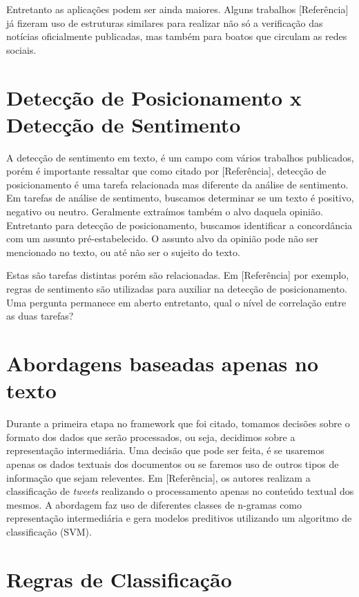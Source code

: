 \quad Entretanto as aplicações podem ser ainda maiores. Alguns trabalhos [Referência]
já fizeram uso de estruturas similares para realizar não só a verificação das notícias
oficialmente publicadas, mas também para boatos que circulam as redes sociais.

\section{Detecção de Posicionamento x Detecção de Sentimento}

\quad A detecção de sentimento em texto, é um campo com vários trabalhos publicados,
porém é importante ressaltar que como citado por [Referência], detecção de
posicionamento é uma tarefa relacionada mas diferente da análise de sentimento.
Em tarefas de análise de sentimento, buscamos determinar se um texto é positivo,
negativo ou neutro. Geralmente extraímos também o alvo daquela opinião. Entretanto
para detecção de posicionamento, buscamos identificar a concordância com um assunto
pré-estabelecido. O assunto alvo da opinião pode não ser mencionado no texto, ou até
não ser o sujeito do texto.

\quad Estas são tarefas distintas porém são relacionadas. Em [Referência] por exemplo,
regras de sentimento são utilizadas para auxiliar na detecção de posicionamento. Uma
pergunta permanece em aberto entretanto, qual o nível de correlação entre as
duas tarefas?

\section{Abordagens baseadas apenas no texto}

\quad Durante a primeira etapa no framework que foi citado, tomamos decisões sobre o
formato dos dados que serão processados, ou seja, decidimos sobre a representação
intermediária. Uma decisão que pode ser feita, é se usaremos apenas os dados
textuais dos documentos ou se faremos uso de outros tipos de informação que sejam
releventes. Em [Referência], os autores realizam a classificação de \textit{tweets}
realizando o processamento apenas no conteúdo textual dos mesmos. A abordagem faz uso
de diferentes classes de n-gramas como representação intermediária e gera modelos
preditivos utilizando um algoritmo de classificação (SVM).

\section{Regras de Classificação}

